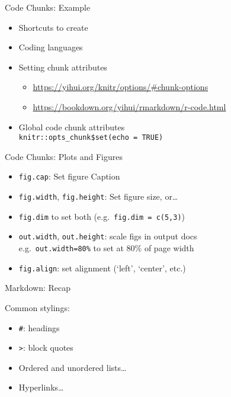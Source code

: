 \documentclass[
  ignorenonframetext,
]{beamer}
\providecommand{\tightlist}{%
  \setlength{\itemsep}{0pt}\setlength{\parskip}{0pt}}
\begin{document}
\begin{frame}[fragile]{Code Chunks: Example}
\protect\hypertarget{code-chunks-example}{}
\begin{itemize}
\tightlist
\item
  Shortcuts to create
\item
  Coding languages
\item
  Setting chunk attributes

  \begin{itemize}
  \tightlist
  \item
    \url{https://yihui.org/knitr/options/\#chunk-options}
  \item
    \url{https://bookdown.org/yihui/rmarkdown/r-code.html}
  \end{itemize}
\item
  Global code chunk attributes\\
  \texttt{knitr::opts\_chunk\$set(echo\ =\ TRUE)}
\end{itemize}
\end{frame}

\begin{frame}[fragile]{Code Chunks: Plots and Figures}
\protect\hypertarget{code-chunks-plots-and-figures}{}
\begin{itemize}
\tightlist
\item
  \texttt{fig.cap}: Set figure Caption
\item
  \texttt{fig.width}, \texttt{fig.height}: Set figure size, or\ldots{}
\item
  \texttt{fig.dim} to set both (e.g.~\texttt{fig.dim\ =\ c(5,3)})
\item
  \texttt{out.width}, \texttt{out.height}: scale figs in output docs\\
  e.g.~\texttt{out.width=80\%} to set at 80\% of page width
\item
  \texttt{fig.align}: set alignment (`left', `center', etc.)
\end{itemize}
\end{frame}

\begin{frame}[fragile]{Markdown: Recap}
\protect\hypertarget{markdown-recap}{}
\begin{block}{Common stylings:}
\protect\hypertarget{common-stylings}{}
\begin{itemize}
\tightlist
\item
  \texttt{\#}: headings
\item
  \texttt{\textgreater{}}: block quotes
\item
  Ordered and unordered lists\ldots{}
\item
  Hyperlinks\ldots{}
\end{itemize}
\end{block}
\end{frame}
\end{document}
